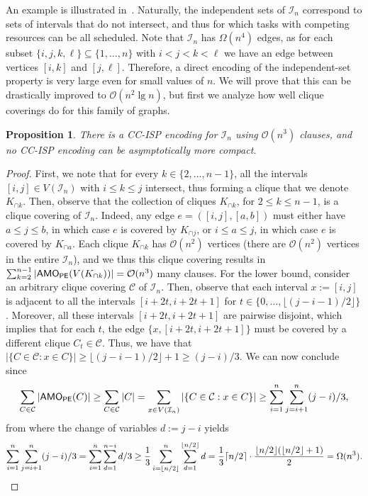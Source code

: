 \documentclass[11pt]{article}
\newtheorem{proposition}[theorem]{Proposition}
\renewcommand{\O}{\mathcal{O}}
\begin{document}
An example is illustrated in~. Naturally, the independent sets of $\mathcal{I}_n$ correspond to sets of intervals that do not intersect, and thus for which tasks with competing resources can be all scheduled.
Note that $\mathcal{I}_n$ has $\Omega(n^4)$ edges, as for each subset $\{i, j, k, \ell\} \subseteq \{1, \ldots, n\}$ with $i < j < k < \ell$ we have an edge between vertices $[i, k]$ and $[j, \ell]$. Therefore, a direct encoding of the independent-set property is very large even for small values of $n$. We will prove that this can be drastically improved to $\O(n^2 \lg n)$, but first we analyze how well clique coverings do for this family of graphs.

\begin{proposition}\label{prop:cliques_for_intervals}
    There is a CC-ISP encoding for $\mathcal{I}_n$ using $\O(n^3)$ clauses, and no CC-ISP encoding can be asymptotically more compact.
\end{proposition}
\begin{proof}
    First, we note that for every $k \in \{2, \ldots, n-1\}$, all the intervals $[i, j] \in V(\mathcal{I}_n)$ with $i \leq k \leq j$ intersect, thus forming a clique that we denote $K_{{\cap}k}$. Then, observe that the collection of cliques $K_{{\cap}k}$, for $2 \leq k \leq n-1$, is a clique covering of $\mathcal{I}_n$. Indeed, any edge $e = ([i, j], [a, b])$ must either have $a \leq j \leq b$, in which case $e$ is covered by $K_{{\cap} j}$, or $i \leq a \leq j$, in which case $e$ is covered by $K_{{\cap} a}$.
    Each clique $K_{{\cap} k}$ has $\O(n^2)$ vertices (there are $\O(n^2)$ vertices in the entire $\mathcal{I}_n$), and we thus this clique covering results in  $\sum_{k=2}^{n-1} |\amope(V(K_{{\cap} k} ))| = \O(n^3)$ many clauses. For the lower bound, consider an arbitrary clique covering $\mathcal{C}$ of $\mathcal{I}_n$. 
    Then, observe that each interval $x := [i, j]$ is adjacent to all the intervals $[i + 2t, i + 2t+1]$ for $t \in \{0, \ldots, \lfloor (j - i - 1)/2\rfloor\}$. Moreover, all these intervals $[i + 2t, i + 2t+1]$ are pairwise disjoint, which implies that for each $t$, the edge $\{x, [i + 2t, i + 2t+1]\}$ must be covered by a different clique $C_t \in \mathcal{C}$. %
    Thus, we have that $|\{C \in \mathcal{C} : x \in C\}| \geq \lfloor (j - i - 1)/2\rfloor + 1 \geq (j - i)/3$. We can now conclude since 
    \begin{align*}
    \sum_{C \in \mathcal{C}} |\textsf{AMO}_{\textsf{PE}}(C)|  \geq \sum_{C \in \mathcal{C}} |C| = \sum_{x \in V(\mathcal{I}_n)} |\{C \in \mathcal{C} : x \in C\}| \geq \sum_{i = 1}^{n} \sum_{j = i+1}^{n} (j-i)/3,
    \end{align*}
    from where the change of variables $d := j-i$ yields
    \[
    \sum_{i = 1}^{n} \sum_{j = i+1}^{n} (j-i)/3 = \sum_{i = 1}^{n} \sum_{d = 1}^{n-i} d/3 
    \geq  \frac{1}{3}\sum_{i = \lfloor n/2\rfloor}^{n} \sum_{d = 1}^{\lfloor n/2 \rfloor} d  = \frac{1}{3}\lceil n/2 \rceil \cdot \frac{\lfloor n/2 \rfloor (\lfloor n/2\rfloor + 1)}{2} = \Omega(n^3).\qedhere
    \]
\end{proof}
\end{document}

